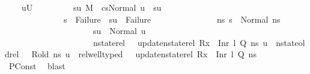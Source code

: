 \begin{isabellebody}
\ \ \ \ {\isachardoublequoteopen}{\isacharparenleft}{\kern0pt}{\isasymforall}u{\isasymin}U{}{\isachardot}{\kern0pt}\isanewline
\ \ \ \ \ \ \ \ \ {\isasymexists}su{\isachardot}{\kern0pt}\ {\isacharparenleft}{\kern0pt}M{\isacharcomma}{\kern0pt}{\isasymLambda}{\isacharprime}{\kern0pt}{\isacharcomma}{\kern0pt}{\isasymGamma}{\isacharcomma}{\kern0pt}{\isasymOmega}\ {\isasymturnstile}\ {\isasymlangle}cs{}{\isacharcomma}{\kern0pt}Normal\ u{\isasymrangle}\ {\isacharbrackleft}{\kern0pt}{\isasymrightarrow}{\isacharbrackright}{\kern0pt}\ su{\isacharparenright}{\kern0pt}\ {\isasymand}\isanewline
\ \ \ \ \ \ \ \ \ \ \ \ \ \ {\isacharparenleft}{\kern0pt}s{\isacharprime}{\kern0pt}\ {\isacharequal}{\kern0pt}\ Failure\ {\isasymlongrightarrow}\ su\ {\isacharequal}{\kern0pt}\ Failure{\isacharparenright}{\kern0pt}\ {\isasymand}\isanewline
\ \ \ \ \ \ \ \ \ \ \ \ \ \ {\isacharparenleft}{\kern0pt}{\isasymforall}ns{\isacharprime}{\kern0pt}{\isachardot}{\kern0pt}\ s{\isacharprime}{\kern0pt}\ {\isacharequal}{\kern0pt}\ Normal\ ns{\isacharprime}{\kern0pt}\ {\isasymlongrightarrow}\isanewline
\ \ \ \ \ \ \ \ \ \ \ \ \ \ \ \ \ \ \ \ \ su\ {\isacharequal}{\kern0pt}\ Normal\ u\ {\isasymand}\isanewline
\ \ \ \ \ \ \ \ \ \ \ \ \ \ \ \ \ \ \ \ \ nstate{\isacharunderscore}{\kern0pt}rel\ {\isasymLambda}\ {\isasymLambda}{\isacharprime}{\kern0pt}\ {\isacharparenleft}{\kern0pt}update{\isacharunderscore}{\kern0pt}nstate{\isacharunderscore}{\kern0pt}rel\ {\isacharparenleft}{\kern0pt}R{\isacharparenleft}{\kern0pt}x{}\ {\isasymmapsto}\ Inr\ l{\isacharparenright}{\kern0pt}{\isacharparenright}{\kern0pt}\ Q{\isacharparenright}{\kern0pt}\ ns{\isacharprime}{\kern0pt}\ u\ {\isasymand}\ nstate{\isacharunderscore}{\kern0pt}old{\isacharunderscore}{\kern0pt}rel\ {\isasymLambda}\ {\isasymLambda}{\isacharprime}{\kern0pt}\ R{\isacharunderscore}{\kern0pt}old\ ns{\isacharprime}{\kern0pt}\ u\ {\isasymand}\ rel{\isacharunderscore}{\kern0pt}well{\isacharunderscore}{\kern0pt}typed\ {\isasymLambda}\ {\isasymOmega}\ {\isacharparenleft}{\kern0pt}update{\isacharunderscore}{\kern0pt}nstate{\isacharunderscore}{\kern0pt}rel\ {\isacharparenleft}{\kern0pt}R{\isacharparenleft}{\kern0pt}x{}\ {\isasymmapsto}\ Inr\ l{\isacharparenright}{\kern0pt}{\isacharparenright}{\kern0pt}\ Q{\isacharparenright}{\kern0pt}\ ns{\isacharprime}{\kern0pt}{\isacharparenright}{\kern0pt}{\isacharparenright}{\kern0pt}{\isachardoublequoteclose}\isanewline
\ \ \ \ \isamarkupfalse%
\ PConst\ \isamarkupfalse%
\ blast\ \ \ \ \isanewline
\ \ \isamarkupfalse%

\end{isabellebody}
